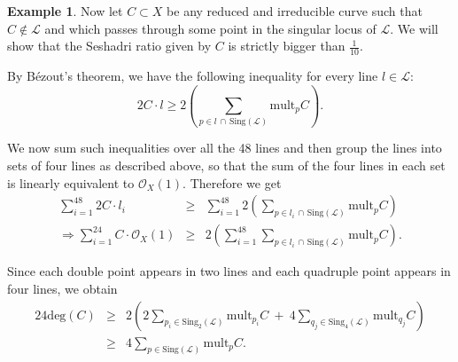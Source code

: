 \documentclass[12pt,reqno]{amsart}
\theoremstyle{plain}
\numberwithin{equation}{section}
\theoremstyle{definition}
\newtheorem{example}[theorem]{Example}
\begin{document}
\begin{example}
		Now let $C \subset X$ be any reduced and irreducible curve such that $C \notin \mathcal{L}$ and which passes through some point in the singular locus of 
		$\mathcal{L}$. We will show that the Seshadri ratio given by $C$ is strictly bigger than $\frac{1}{10}$. 
  
  By B\'ezout's theorem, we have the following inequality for every line $l \in \mathcal{L}$:
		$$2 C \cdot l \ge 2\left( \sum_{p \in l \,\cap \,\text{Sing} (\mathcal{L})} \text{mult}_p C \right).$$
  
We now sum such inequalities over all the 48 lines and then group the lines into sets of four lines as described above, so that the sum of the four lines in each set is linearly equivalent to $\mathcal{O}_X(1)$.  Therefore we get
               \begin{eqnarray*}
                \sum\limits_{i=1}^{48} 2 C \cdot l_i &\ge& \sum\limits_{i=1}^{48} 2\left( \sum_{p \in l_i \,\cap \,\text{Sing} (\mathcal{L})} \text{mult}_p C \right) \\
                \Rightarrow  \sum\limits_{i=1}^{24} C \cdot \mathcal{O}_X(1) &\ge&  2\left( \sum\limits_{i=1}^{48}\sum_{p \in l_i \,\cap \,\text{Sing} (\mathcal{L})} \text{mult}_p C \right).
               \end{eqnarray*}

Since each double point appears in two lines and each quadruple point appears in four lines, we obtain 
		\begin{eqnarray*}
				24 \text{deg}(C) &\geq& 2 \left(2\sum\limits_{p_i \in \text{Sing}_2(\mathcal{L})} \text{mult}_{p_i} C ~+~ 4\sum\limits_{q_j \in \text{Sing}_4(\mathcal{L})} \text{mult}_{q_j}C \right) \\
		 &\geq& 4 \sum\limits_{p \in\text{Sing}(\mathcal{L})} \text{mult}_{p}C.
		\end{eqnarray*}
		\iffalse
		Using the sets  $\mathcal{L}_1$, $\mathcal{L}_2$, \ldots, $\mathcal{L}_{24}$  constructed above, we obtain
		\begin{eqnarray*}
	\sum\limits_{i=1}^{48} C \cdot l_i &\geq& 2\sum\limits_{p\in \text{Sing}(\mathcal{L})} \text{mult}_pC \\ 
		\Longrightarrow \sum\limits_{1}^{24} \mathcal{O}_X(1) \cdot C  &\geq& 2\sum\limits_{p\in \text{Sing}(\mathcal{L})} \text{mult}_pC \\ 
		\Longrightarrow 24 \text{deg}(C) &\geq& 2 \left(2\sum\limits_{p_i \in \text{Sing}_2(\mathcal{L})} \text{mult}_{p_i} C ~+~ 4\sum\limits_{p_j \in \text{Sing}_4(\mathcal{L})} \text{mult}_{p_j}C \right) \\
		\Longrightarrow 24 \text{deg}(C) &\geq& 4 \sum\limits_{p \in C\cap \text{Sing}(\mathcal{L})} \text{mult}_{p}C \\
		\Longrightarrow 6 \text{deg}(C) &\geq&  \sum\limits_{p \in C\cap \text{Sing}(\mathcal{L})} \text{mult}_{p}C.
		\end{eqnarray*}
		\fi


\end{example}
\end{document}
